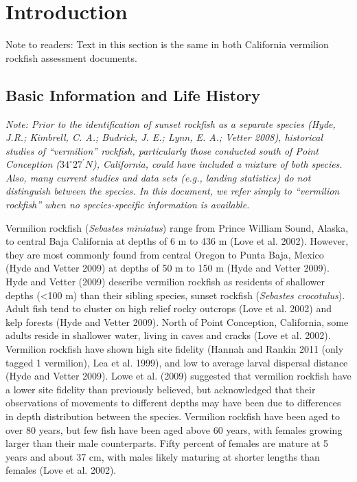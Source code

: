 \documentclass[
  english,
  a4paper,
]{article}
\begin{document}
\hypertarget{introduction}{%
\section{Introduction}\label{introduction}}

Note to readers: Text in this section is the same in both California vermilion rockfish assessment
documents.

\hypertarget{basic-information-and-life-history}{%
\subsection{Basic Information and Life History}\label{basic-information-and-life-history}}

\emph{Note: Prior to the identification of sunset rockfish as a separate species (Hyde, J.R.; Kimbrell, C. A.; Budrick, J. E.; Lynn, E. A.; Vetter 2008), historical studies of ``vermilion'' rockfish, particularly those conducted south of Point Conception ($34^\circ 27^\prime N$), California, could have included a mixture of both species. Also, many current studies and data sets (e.g., landing statistics) do not distinguish between the species. In this document, we refer simply to ``vermilion rockfish'' when no species-specific information is available.}

Vermilion rockfish (\emph{Sebastes miniatus}) range from Prince William Sound, Alaska, to central Baja California at
depths of 6 m to 436 m (Love et al. 2002). However, they are most commonly found from central Oregon
to Punta Baja, Mexico (Hyde and Vetter 2009) at depths of 50 m to 150 m (Hyde and Vetter 2009). Hyde and Vetter
(2009) describe vermilion rockfish as residents of shallower depths (\textless100 m) than their sibling species,
sunset rockfish (\emph{Sebastes crocotulus}). Adult fish tend to cluster on high relief rocky outcrops (Love et al. 2002)
and kelp forests (Hyde and Vetter 2009). North of Point Conception, California, some adults reside in shallower water,
living in caves and cracks (Love et al. 2002). Vermilion rockfish have shown high site fidelity
(Hannah and Rankin 2011 (only tagged 1 vermilion), Lea et al. 1999), and low to average larval dispersal
distance (Hyde and Vetter 2009). Lowe et al. (2009) suggested that vermilion rockfish
have a lower site fidelity than previously believed, but acknowledged that their
observations of movements to different depths may have been due to differences in depth distribution between the species.
Vermilion rockfish have been aged to over 80 years, but few fish have been aged above 60 years, with females growing larger than their male counterparts. Fifty percent of females are mature at 5 years and about
37 cm, with males likely maturing at shorter lengths than females (Love et al. 2002).
\end{document}
